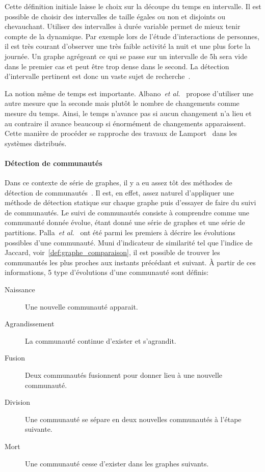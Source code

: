 Cette définition initiale laisse le choix sur la découpe du temps en intervalle.
Il est possible de choisir des intervalles de taille égales ou non et disjoints ou chevauchant\cite{Wang2012}.
Utiliser des intervalles à durée variable permet de mieux tenir compte de la dynamique.
Par exemple lors de l'étude d'interactions de personnes, il est très courant d'observer une très faible activité la nuit et une plus forte la journée.
Un graphe agrégeant ce qui se passe sur un intervalle de 5h sera vide dans le premier cas et peut être trop dense dans le second.
La détection d'intervalle pertinent est donc un vaste sujet de recherche~\cite{Rosvall2010,Krings2012,Ribeiro2013,Caceres2013,Peel2015,de2016detection}.

La notion même de temps est importante.
Albano~\emph{et al.}~\cite{Albano2014} propose d'utiliser une autre mesure que la seconde mais plutôt le nombre de changements comme mesure du temps.
Ainsi, le temps n'avance pas si aucun changement n'a lieu et au contraire il avance beaucoup si énormément de changements apparaissent.
Cette manière de procéder se rapproche des travaux de Lamport~\cite{Lamport1978} dans les systèmes distribués.

\paragraph{Détection de communautés}
Dans ce contexte de série de graphes, il y a eu assez tôt des méthodes de détection de communautés~\cite{Hopcroft2004,Sun2007,Lin2008,Asur2009}.
Il est, en effet, assez naturel d'appliquer une méthode de détection statique sur chaque graphe puis d'essayer de faire du suivi de communautés.
Le suivi de communautés consiste à comprendre comme une communauté donnée évolue, étant donné une série de graphes et une série de partitions.
Palla~\emph{et al.}~\cite{Palla2007} ont été parmi les premiers à décrire les évolutions possibles d'une communauté.
Muni d'indicateur de similarité tel que l'indice de Jaccard, voir~\ref{def:graphe_comparaison}, il est possible de trouver les communautés les plus proches aux instants précédant et suivant.
\`A partir de ces informations, 5 type d'évolutions d'une communauté sont définis:
\begin{description}
\item[Naissance] Une nouvelle communauté apparait.
\item[Agrandissement] La communauté continue d'exister et s'agrandit.
\item[Fusion] Deux communautés fusionnent pour donner lieu à une nouvelle communauté.
\item[Division] Une communauté se sépare en deux nouvelles communautés à l'étape suivante.
\item[Mort] Une communauté cesse d'exister dans les graphes suivants.
\end{description}

